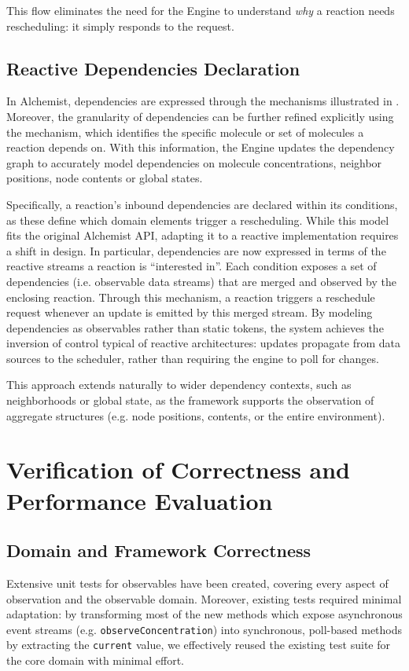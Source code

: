 This flow eliminates the need for the Engine to understand \emph{why} a
reaction needs rescheduling: it simply responds to the request.

\subsection{Reactive Dependencies Declaration}
In Alchemist, dependencies are expressed through the mechanisms illustrated in
. Moreover, the granularity of dependencies can be
further refined explicitly using the  mechanism, which
identifies the specific molecule or set of molecules a reaction depends on.
With this information, the Engine updates the dependency graph to accurately
model dependencies on molecule concentrations, neighbor positions, node
contents or global states.

Specifically, a reaction's inbound dependencies are declared within its
conditions, as these define which domain elements trigger a rescheduling. While
this model fits the original Alchemist API, adapting it to a reactive
implementation requires a shift in design.
In particular, dependencies are now expressed in terms of the reactive streams
a reaction is ``interested in''. Each condition exposes a set of dependencies
(i.e. observable data streams) that are merged and observed by the enclosing
reaction. Through this mechanism, a reaction triggers a reschedule request
whenever an update is emitted by this merged stream. By modeling dependencies
as observables rather than static tokens, the system achieves the inversion of
control typical of reactive architectures: updates propagate from data sources
to the scheduler, rather than requiring the engine to poll for
changes.

This approach extends naturally to wider dependency contexts, such as
neighborhoods or global state, as the framework supports the observation of
aggregate structures (e.g. node positions, contents, or the entire
environment).

\section{Verification of Correctness and Performance Evaluation}

\subsection{Domain and Framework Correctness }
Extensive unit tests for observables have been created, covering every aspect
of observation and the observable domain. Moreover, existing tests required
minimal adaptation: by transforming most of the new methods which expose
asynchronous event streams (e.g. \texttt{observeConcentration}) into
synchronous, poll-based methods by extracting the \texttt{current} value, we
effectively reused the existing test suite for the core domain with minimal
effort.

